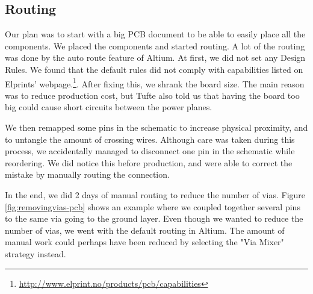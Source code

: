 \subsection {Routing}

Our plan was to start with a big PCB document to be able to easily place all the components. We placed the components and started routing. A lot of the routing was done by the auto route feature of Altium. At first, we did not set any Design Rules. We found that the default rules did not comply with capabilities listed on Elprints' webpage.\footnote {\url{http://www.elprint.no/products/pcb/capabilities}}. After fixing this, we shrank the board size. The main reason was to reduce production cost, but Tufte also told us that having the board too big could cause short circuits between the power planes.

We then remapped some pins in the schematic to increase physical proximity, and to untangle the amount of crossing wires. Although care was taken during this process, we accidentally managed to disconnect one pin in the schematic while reordering. We did notice this before production, and were able to correct the mistake by manually routing the connection.

In the end, we did 2 days of manual routing to reduce the number of vias. Figure \ref{fig:removingvias-pcb} shows an example where we coupled together several pins to the same via going to the ground layer. Even though we wanted to reduce the number of vias, we went with the default routing in Altium. The amount of manual work could perhaps have been reduced by selecting the "Via Mixer" strategy instead. 


